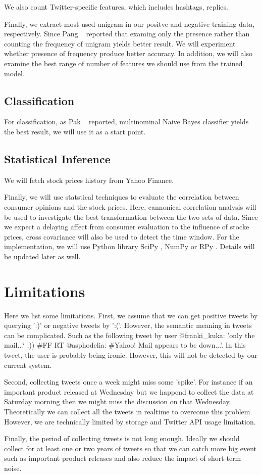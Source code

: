 \documentclass[12pt]{article}
\begin{document}
We also count Twitter-specific features, which includes hashtags, replies.

Finally, we extract most used unigram in our positve and negative training data, respectively. Since Pang \etal~\cite{Pang:02} reported that examing only the presence rather than counting the frequency of unigram yields better result. We will experiment whether presence of frequency produce better accuracy. In addition, we will also examine the best range of number of features we should use from the trained model.

\subsection{Classification}\label{classification}
For classification, as Pak \etal~\cite{Pak:10} reported, multinominal Naive Bayes classifier yields the best result, we will use it as a start point.

\subsection{Statistical Inference}\label{statistical-inference}
We will fetch stock prices history from Yahoo Finance.

Finally, we will use statstical techniques to evaluate the correlation between consumer opinions and the stock prices. Here, cannonical correlation analysis will be used to investigate the best transformation between the two sets of data. Since we expect a delaying affect from consumer evaluation to the influence of stocke prices, cross covariance will also be used to detect the time window. For the implementation, we will use Python library SciPy \cite{SciPy}, NumPy \cite{NumPy} or RPy \cite{RPy}. Details will be updated later as well.

\section{Limitations}
Here we list some limitations. First, we assume that we can get positive tweets by querying ':)' or negative tweets by ':('. However, the semantic meaning in tweets can be complicated. Such as the following tweet by user @franki\_kuka: 'only the mail..? ;)) \#FF RT @asphodelia: \#Yahoo! Mail appears to be down...'. In this tweet, the user is probably being ironic. However, this will not be detected by our current system.

Second, collecting tweets once a week might miss some 'spike'. For instance if an important product released at Wednesday but we happend to collect the data at Saturday morning then we might miss the discussion on that Wednesday. Theoretically we can collect all the tweets in realtime to overcome this problem. However, we are technically limited by storage and Twitter API usage limitation.

Finally, the period of collecting tweets is not long enough. Ideally we should collect for at least one or two years of tweets so that we can catch more big event such as important product releases and also reduce the impact of short-term noise.



\end{document}
